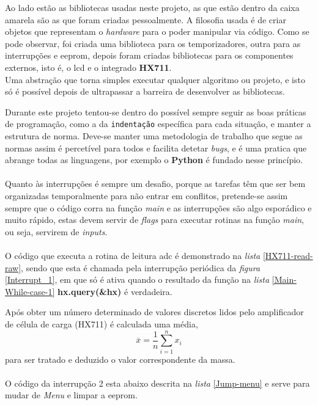 \hspace{2pt}
\begin{minipage}{.6\linewidth}
	Ao lado estão as bibliotecas usadas neste projeto, as que estão dentro da caixa amarela são as que foram criadas pessoalmente.
	A filosofia usada é de criar objetos que representam o \textit{hardware} para o poder manipular via código. Como se pode observar, foi criada uma biblioteca para os temporizadores, outra para as interrupções e \ac{eeprom}, depois foram criadas bibliotecas para os componentes externos, isto é, o \acs{lcd} e o integrado \textbf{HX711}.
	\\
	Uma abstração que torna simples executar qualquer algoritmo ou projeto, e isto só é possível depois de ultrapassar a barreira de desenvolver as bibliotecas.
\end{minipage}
Durante este projeto tentou-se dentro do possível sempre seguir as boas práticas de programação, como a da \texttt{indentação} específica para cada situação, e manter a estrutura de norma. Deve-se manter uma metodologia de trabalho que segue as normas assim é percetível para todos e facilita detetar \textit{bugs}, e é uma pratica que abrange todas as linguagens, por exemplo o \textbf{Python} é fundado nesse princípio.
\\
\\
Quanto às interrupções é sempre um desafio, porque as tarefas têm que ser bem organizadas temporalmente para não entrar em conflitos, pretende-se assim sempre que o código corra na função \textit{main} e as interrupções são algo esporádico e muito rápido, estas devem servir de \textit{flags} para executar rotinas na função \textit{main}, ou seja, servirem de \textit{inputs}. %
\\
\\
O código que executa a rotina de leitura \acs{adc} é demonstrado na \textit{lista} \ref{HX711-read-raw}, sendo que esta é chamada pela interrupção periódica da \textit{figura} \ref{Interrupt_1}, em que só é ativa quando o resultado da função na \textit{lista} \ref{Main-While-case-1} \textbf{hx.query(\&hx)} é verdadeira.
{
	
}
{
	
}
Após obter um número determinado de valores discretos lidos pelo amplificador de célula de carga (HX711) é calculada uma média,
\begin{equation}
	\label{eq:Mean}
	\overline{x}  =  \frac{1}{n}\sum_{i=1}^n x_i
\end{equation}
para ser tratado e deduzido o valor correspondente da massa.
\\
\\
O código da interrupção 2 esta abaixo descrita na \textit{lista} \ref{Jump-menu} e serve para mudar de \textit{Menu} e limpar a \acs{eeprom}.
{
	
}
